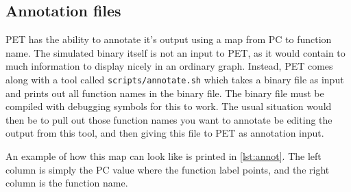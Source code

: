 \subsection{Annotation files}
\label{subsec:annot}
PET has the ability to annotate it's output using a map from PC to function name. The
simulated binary itself is not an input to PET, as it would contain to much information to display nicely in
an ordinary graph. Instead, PET comes along with a tool called \texttt{scripts/annotate.sh} which takes
a binary file as input and prints out all function names in the binary file. The binary file must be compiled
with debugging symbols for this to work. The usual situation would then be to pull out those function names you want
to annotate be editing the output from this tool, and then giving this file to PET as annotation input.

An example of how this map can look like is printed in \autoref{lst:annot}. The
left column is simply the PC value where the function label points, and the
right column is the function name.

